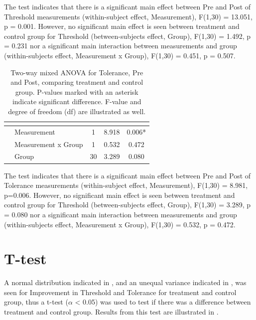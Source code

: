The test indicates that there is a significant main effect between Pre and Post of Threshold measurements (within-subject effect, Measurement), F(1,30) = 13.051, p = 0.001. However, no significant main effect is seen between treatment and control group for Threshold (between-subjects effect, Group), F(1,30) = 1.492, p = 0.231 nor a significant main interaction between measurements and group (within-subjects effect, Measurement x Group), F(1,30) = 0.451, p = 0.507. 
 
\begin{longtable} {l|l|c|c|c}
\caption{Two-way mixed ANOVA for Tolerance, Pre and Post, comparing treatment and control group. P-values marked with an asterisk indicate significant difference. F-value and degree of freedom (df) are illustrated as well.}
	\label{tab:ANOVA2} \\
  \cellcolor[HTML]{C0C0C0}{} &  \cellcolor[HTML]{C0C0C0}{} & \multicolumn{1}{c|}{ \cellcolor[HTML]{C0C0C0}{\textbf{df}}} &
 \multicolumn{1}{c|}{ \cellcolor[HTML]{C0C0C0}{\textbf{F}}} & \multicolumn{1}{c}{ \cellcolor[HTML]{C0C0C0}{\textbf{Sig}}} \\ \hline  
\cellcolor[HTML]{C0C0C0} & Measurement & 1 & 8.918 & 0.006*  \\ \cline{2-5}
\cellcolor[HTML]{C0C0C0}\multirow{-2}{*}{\textbf{Within-Subjects effect}} & Measurement x Group & 1 & 0.532 & 0.472  \\ \hline
\cellcolor[HTML]{C0C0C0}{\textbf{Between-Subjects effect}} & Group & 30 & 3.289 & 0.080  \\ \hline
\end{longtable}
\vspace{-.5cm}

The test indicates that there is a significant main effect between Pre and Post of Tolerance measurements (within-subject effect, Measurement), F(1,30) = 8.981, p=0.006. However, no significant main effect is seen between treatment and control group for Threshold (between-subjects effect, Group), F(1,30) = 3.289, p = 0.080 nor a significant main interaction between  measurements and group (within-subjects effect, Measurement x Group), F(1,30) = 0.532, p = 0.472. 

\section{T-test}
A normal distribution indicated in , and an unequal variance indicated in , was seen for Improvement in Threshold and Tolerance for treatment and control group, thus a t-test ($\alpha$ < 0.05) was used to test if there was a difference between treatment and control group. Results from this test are illustrated in .

